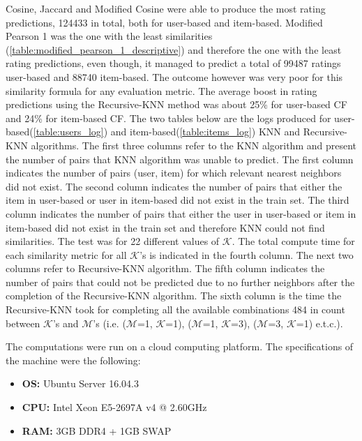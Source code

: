 Cosine, Jaccard and Modified Cosine were able to produce the most rating predictions, 124433 in total,
both for user-based and item-based. Modified Pearson 1 was the one with the least similarities
(\autoref{table:modified_pearson_1_descriptive}) and therefore the one with the least rating
predictions, even though, it managed to predict a total of 99487 ratings user-based
and 88740 item-based. The outcome however was very poor for this similarity formula for any
evaluation metric. The average boost in rating predictions using the Recursive-KNN method was
about 25\% for user-based CF and 24\% for item-based CF.
\newpage
The two tables below are the logs produced for user-based(\autoref{table:users_log})
and item-based(\autoref{table:items_log}) KNN and Recursive-KNN algorithms.
The first three columns refer to the KNN algorithm and present the number of pairs that KNN
algorithm was unable to predict. The first column indicates the number of pairs
(user, item) for which relevant nearest neighbors did not exist. The second column
indicates the number of pairs that either the item in user-based or user in
item-based did not exist in the train set. The third column indicates the number
of pairs that either the user in user-based or item in
item-based did not exist in the train set and therefore KNN could not find similarities.
The test was for 22 different values of $\mathcal{K}$. The total compute time for each similarity
metric for all $\mathcal{K}$'s is indicated in the fourth column.
The next two columns refer to Recursive-KNN algorithm. The fifth column indicates
the number of pairs that could not be predicted due to no further neighbors
after the completion of the Recursive-KNN algorithm.
The sixth column is the time the Recursive-KNN took for completing all the available combinations
484 in count between $\mathcal{K}$'s and $\mathcal{M}$'s (i.e. ($\mathcal{M}$=1, $\mathcal{K}$=1),
($\mathcal{M}$=1, $\mathcal{K}$=3), ($\mathcal{M}$=3, $\mathcal{K}$=1) e.t.c.).

The computations were run on a cloud computing platform.
The specifications of the machine were the following:
\begin{itemize}
	\item[] \textbf{OS:} Ubuntu Server 16.04.3
	\item[] \textbf{CPU:} Intel Xeon E5-2697A v4 @ 2.60GHz
	\item[] \textbf{RAM:} 3GB DDR4 + 1GB SWAP
\end{itemize}

